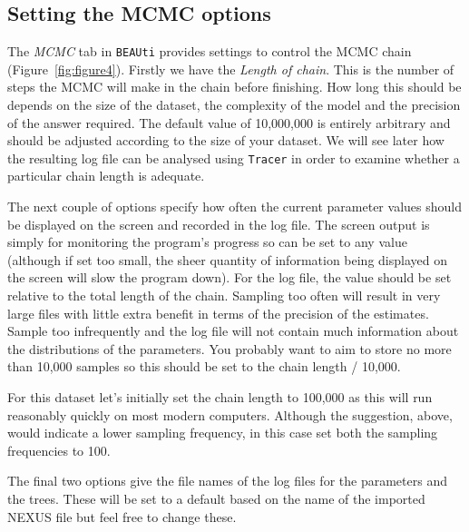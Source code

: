 \documentclass[cup7b, english]{cupbook}
\begin{document}
\subsection{Setting the MCMC options}
\label{MCMC_options}

The {\it MCMC} tab in \texttt{BEAUti} provides settings to control the MCMC chain (Figure~\ref{fig:figure4}). Firstly we have the
{\it Length of chain}. This is the number of steps the MCMC will make in the chain before
finishing. How long this should be depends on the size of the dataset, the complexity of the
model and the precision of the answer required. The default value of 10,000,000 is entirely
arbitrary and should be adjusted according to the size of your dataset. We will see later how
the resulting log file can be analysed using \texttt{Tracer} in order to examine whether a particular
chain length is adequate.

The next couple of options specify how often the current parameter values should be displayed
on the screen and recorded in the log file. The screen output is simply for monitoring the
program's progress so can be set to any value (although if set too small, the sheer quantity
of information being displayed on the screen will slow the program down). For the log
file, the value should be set relative to the total length of the chain. Sampling too often
will result in very large files with little extra benefit in terms of the precision of the
estimates. Sample too infrequently and the log file will not contain much information about
the distributions of the parameters. You probably want to aim to store no more than 10,000
samples so this should be set to the chain length / 10,000.

For this dataset let's initially set the chain length to 100,000 as this will run reasonably
quickly on most modern computers. Although the suggestion, above, would indicate a lower
sampling frequency, in this case set both the sampling frequencies to 100.

The final two options give the file names of the log files for the parameters and the trees.
These will be set to a default based on the name of the imported NEXUS file but feel free
to change these.
\end{document}
